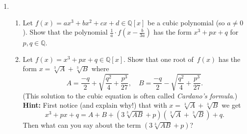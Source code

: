 \documentclass[11pt]{article}
\begin{document}
\begin{enumerate}
\item \begin{enumerate}
\item Let $f(x) = ax^3+bx^2+cx+d \in \mathbb{Q}[x]$ be a cubic polynomial (so $a \neq 0$). Show that the polynomial $\frac{1}{a} \cdot f(x-\frac{b}{3a})$ has the form $x^3+px+q$ for $p,q\in \mathbb{Q}$.
\item Let $f(x) = x^3+px+q\in \mathbb{Q}[x]$. Show that one root of~$f(x)$ has the form $x=\sqrt[3]{A}+\sqrt[3]{B}$ where 
\[ A = \frac{-q}{2} + \sqrt{\frac{q^2}{4}+\frac{p^3}{27}}, \quad B = \frac{-q}{2} - \sqrt{\frac{q^2}{4}+\frac{p^3}{27}}.\]
(This solution to the cubic equation is often called \emph{Cardano's formula}.) \\
{\bf Hint:} First notice (and explain why!) that with $x=\sqrt[3]{A}+\sqrt[3]{B}$ we get 
\[ x^3+px+q = A+B+(3\sqrt[3]{AB}+p)(\sqrt[3]{A}+\sqrt[3]{B})+q.\]
Then what can you say about the term $(3\sqrt[3]{AB}+p)$?
\end{enumerate}

\end{enumerate}
\end{document}
